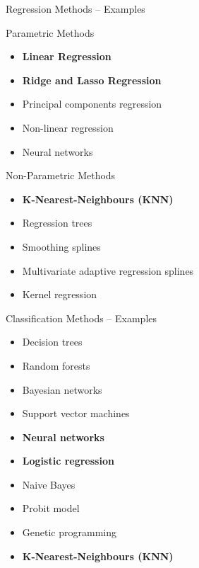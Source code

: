 \documentclass[ignorenonframetext,xcolor=x11names]{beamer}
\begin{document}
\begin{frame}[label=full]{Regression Methods -- Examples}
\begin{block}{Parametric Methods}
\begin{itemize}
   \item \textbf{Linear Regression}
   \item \textbf{Ridge and Lasso Regression}
   \item Principal components regression
   \item Non-linear regression
   \item Neural networks
\end{itemize}
\end{block}

\begin{block}{Non-Parametric Methods}
\begin{itemize}
  \item \textbf{K-Nearest-Neighbours (KNN)}
  \item Regression trees
  \item Smoothing splines
  \item Multivariate adaptive regression splines
  \item Kernel regression
\end{itemize}
\end{block}
\end{frame}

\begin{frame}[label=full]{Classification Methods -- Examples}
\begin{itemize}
   \item Decision trees
   \item Random forests
   \item Bayesian networks
   \item Support vector machines
   \item \textbf{Neural networks}
   \item \textbf{Logistic regression}
   \item Naive Bayes
   \item Probit model
   \item Genetic programming
   \item \textbf{K-Nearest-Neighbours (KNN)}
\end{itemize}
\end{frame}
\end{document}

